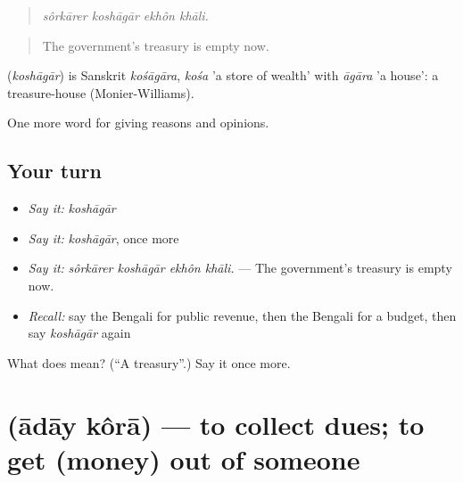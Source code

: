 \begin{quote}
   
\end{quote}

\begin{quote}
\emph{sôrkārer koshāgār ekhôn khāli.}
\end{quote}

\begin{quote}
The government's treasury is empty now.
\end{quote}

\begin{cousinweb}
\textbf{} (\emph{koshāgār}) is Sanskrit \emph{kośāgāra}, \emph{kośa} 'a store of wealth' with \emph{āgāra} 'a house': a treasure-house (Monier-Williams).
\end{cousinweb}

\begin{grammarlens}[title={What you've built}]
One more word for giving reasons and opinions.
\end{grammarlens}

\subsection*{Your turn}
\begin{itemize}
\raggedright
  \item \emph{Say it:} \emph{koshāgār}
  \item \emph{Say it:} \emph{koshāgār}, once more
  \item \emph{Say it:} \emph{sôrkārer koshāgār ekhôn khāli.} — The government's treasury is empty now.
  \item \emph{Recall:} say the Bengali for public revenue, then the Bengali for a budget, then say \emph{koshāgār} again
\end{itemize}

\begin{tcolorbox}[breakable,colback=teal!4,colframe=teal!35!black,title={Before you move on}]
What does  mean? (\textquotedblleft{}A treasury\textquotedblright{}.) Say it once more.
\end{tcolorbox}
\section[\texorpdfstring{\bn{আদায়} \bn{করা} (ādāy kôrā)}{আদায় করা (ādāy kôrā)}]{  (ādāy kôrā) — to collect dues; to get (money) out of someone}

\label{lesson:BN-C348-aday-kora}



